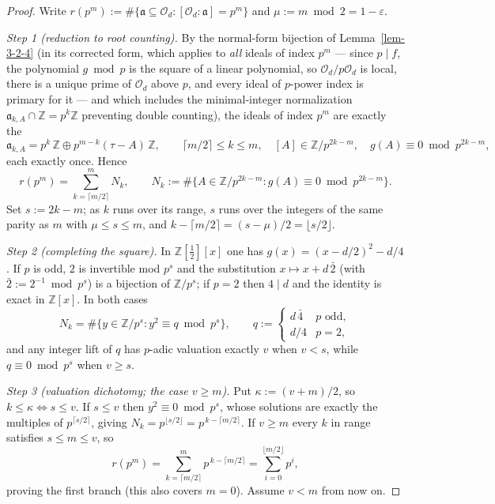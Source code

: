 \begin{proof}
Write $r(p^m) := \#\{\mathfrak a \subseteq \mathcal{O}_d :
[\mathcal{O}_d : \mathfrak a] = p^m\}$ and $\mu := m \bmod 2 = 1 - \varepsilon$.

\emph{Step 1 (reduction to root counting).} By the normal-form bijection of
Lemma~\ref{lem-3-2-4} (in its corrected form, which applies to \emph{all} ideals of
index $p^m$ --- since $p \mid f$, the polynomial $g \bmod p$ is the square of a linear
polynomial, so $\mathcal{O}_d/p\mathcal{O}_d$ is local, there is a unique prime of
$\mathcal{O}_d$ above $p$, and every ideal of $p$-power index is primary for it ---
and which includes the minimal-integer normalization
$\mathfrak a_{k,A} \cap \mathbb{Z} = p^k\mathbb{Z}$ preventing double counting), the
ideals of index $p^m$ are exactly the
\[
\mathfrak a_{k,A} = p^k\,\mathbb{Z} \oplus p^{m-k}(\tau - A)\,\mathbb{Z},
\qquad
\lceil m/2 \rceil \leq k \leq m,\quad
[A] \in \mathbb{Z}/p^{2k-m},\quad
g(A) \equiv 0 \bmod p^{2k-m},
\]
each exactly once. Hence
\[
r(p^m) = \sum_{k=\lceil m/2 \rceil}^{m} N_k,
\qquad
N_k := \#\{A \in \mathbb{Z}/p^{2k-m} : g(A) \equiv 0 \bmod p^{2k-m}\}.
\]
Set $s := 2k - m$; as $k$ runs over its range, $s$ runs over the integers of the same
parity as $m$ with $\mu \leq s \leq m$, and
$k - \lceil m/2 \rceil = (s - \mu)/2 = \lfloor s/2 \rfloor$.

\emph{Step 2 (completing the square).} In $\mathbb{Z}[\tfrac12][x]$ one has
$g(x) = (x - d/2)^2 - d/4$. If $p$ is odd, $2$ is invertible mod $p^s$ and the
substitution $x \mapsto x + d\,\bar 2$ (with $\bar 2 := 2^{-1} \bmod p^s$) is a
bijection of $\mathbb{Z}/p^s$; if $p = 2$ then $4 \mid d$ and the identity is exact
in $\mathbb{Z}[x]$. In both cases
\[
N_k = \#\{y \in \mathbb{Z}/p^s : y^2 \equiv q \bmod p^s\},
\qquad
q := \begin{cases} d\,\bar 4 & p \text{ odd},\\ d/4 & p = 2,\end{cases}
\]
and any integer lift of $q$ has $p$-adic valuation exactly $v$ when $v < s$, while
$q \equiv 0 \bmod p^s$ when $v \geq s$.

\emph{Step 3 (valuation dichotomy; the case $v \geq m$).} Put
$\kappa := (v + m)/2$, so $k \leq \kappa \iff s \leq v$. If $s \leq v$ then
$y^2 \equiv 0 \bmod p^s$, whose solutions are exactly the multiples of
$p^{\lceil s/2 \rceil}$, giving
$N_k = p^{\lfloor s/2 \rfloor} = p^{\,k - \lceil m/2 \rceil}$. If $v \geq m$ every
$k$ in range satisfies $s \leq m \leq v$, so
\[
r(p^m) = \sum_{k = \lceil m/2 \rceil}^{m} p^{\,k - \lceil m/2 \rceil}
= \sum_{i=0}^{\lfloor m/2 \rfloor} p^i,
\]
proving the first branch (this also covers $m = 0$). Assume $v < m$ from now on.


\end{proof}

